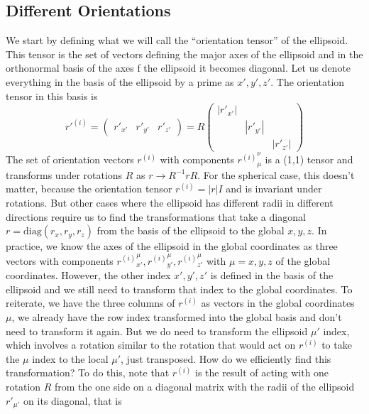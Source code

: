 \documentclass[nofootinbib,preprint,floatfix,titlepage,superscriptaddress]{revtex4} %
\begin{document}
\subsection{Different Orientations}
We start by defining what we will call the ``orientation tensor'' of the ellipsoid. 
This tensor is the set of vectors defining the major axes of the ellipsoid and in the orthonormal basis of the axes f the ellipsoid it becomes diagonal. Let us denote everything in the basis of the ellipsoid by a prime as $x',y',z'$. The orientation tensor in this basis is  
\begin{equation}
    {r'}^{(i)} = \left(\begin{array}{c|c|c}r'_{x'} & r'_{y'} &r'_{z'}\end{array}
    \right) = R \begin{pmatrix}
    |r'_{x'}| \\ 
    & |r'_{y'}|\\ 
    & &|r'_{z'}|
    \end{pmatrix}
    \label{eq:ell}
\end{equation}
The set of orientation vectors $r^{(i)}$ with components ${r^{(i)}}_{\mu}^\nu$ is a (1,1) tensor and transforms under rotations $R$ as $r \to R^{-1} r R$. 
For the spherical case, this doesn't matter, because the orientation tensor $r^{(i)} = |r|I$ and is invariant under rotations. 
But other cases where the ellipsoid has different radii in different directions require us to find the transformations that take a diagonal $r = \mathrm{diag}(r_x,r_y,r_z)$ from the basis of the ellipsoid to the global $x,y,z$. 
In practice, we know the axes of the ellipsoid in the global coordinates as three vectors with components  ${r^{(i)}}_{x'}^\mu, {r^{(i)}}_{y'}^\mu, {r^{(i)}}_{z'}^\mu$ with $\mu = x,y,z$ of the global coordinates. However, the other index $x',y',z'$ is defined in the basis of the ellipsoid and we still need to transform that index to the global coordinates.  
To reiterate,  we have the three columns of $r^{(i)}$ as vectors in the global coordinates $\mu$, we already have the row index transformed into the global basis and don't need to transform it again. 
But we do need to transform the ellipsoid $\mu'$ index, which involves a rotation similar to the rotation that would act on $r^{(i)}$ to take the $\mu$ index to the local $\mu'$, just transposed. 
How do we efficiently find this transformation? 
To do this, note that $r^{(i)}$ is the result of acting with one rotation $R$ from the one side on a diagonal matrix with the radii of the ellipsoid $r'_{\mu'}$ on its diagonal, that is
\end{document}
